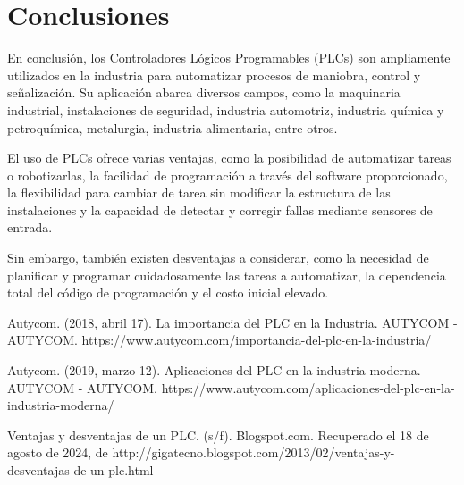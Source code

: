 \documentclass[12pt]{report}
\begin{document}
\chapter{Conclusiones}
En conclusión, los Controladores Lógicos Programables (PLCs) son ampliamente utilizados en la industria para automatizar procesos de maniobra, control y señalización. Su aplicación abarca diversos campos, como la maquinaria industrial, instalaciones de seguridad, industria automotriz, industria química y petroquímica, metalurgia, industria alimentaria, entre otros.

El uso de PLCs ofrece varias ventajas, como la posibilidad de automatizar tareas o robotizarlas, la facilidad de programación a través del software proporcionado, la flexibilidad para cambiar de tarea sin modificar la estructura de las instalaciones y la capacidad de detectar y corregir fallas mediante sensores de entrada.

Sin embargo, también existen desventajas a considerar, como la necesidad de planificar y programar cuidadosamente las tareas a automatizar, la dependencia total del código de programación y el costo inicial elevado.
\newpage
\begin{thebibliography}{2}
      Autycom. (2018, abril 17). La importancia del PLC en la Industria. AUTYCOM - AUTYCOM. https://www.autycom.com/importancia-del-plc-en-la-industria/

      Autycom. (2019, marzo 12). Aplicaciones del PLC en la industria moderna. AUTYCOM - AUTYCOM. https://www.autycom.com/aplicaciones-del-plc-en-la-industria-moderna/

      Ventajas y desventajas de un PLC. (s/f). Blogspot.com. Recuperado el 18 de agosto de 2024, de http://gigatecno.blogspot.com/2013/02/ventajas-y-desventajas-de-un-plc.html
\end{thebibliography}
\end{document}
